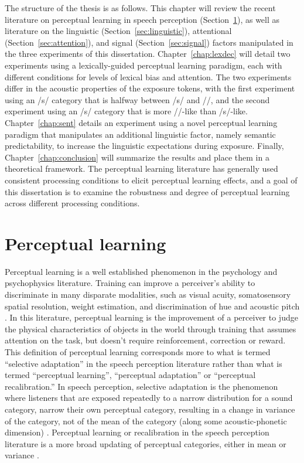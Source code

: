 The structure of the thesis is as follows.
This chapter will review the recent literature on perceptual learning in speech perception (Section~\ref{sec:perceptuallearning}), as well as literature on the linguistic (Section~\ref{sec:linguistic}), attentional (Section~\ref{sec:attention}), and signal (Section~\ref{sec:signal}) factors manipulated in the three experiments of this dissertation.
Chapter~\ref{chap:lexdec} will detail two experiments using a lexically-guided perceptual learning paradigm, each with different conditions for levels of lexical bias and attention.  
The two experiments differ in the acoustic properties of the exposure tokens, with the first experiment using an /s/ category that is halfway between /s/ and /\textesh/, and the second experiment using an /s/ category that is more /\textesh/-like than /s/-like.  
Chapter~\ref{chap:sent} details an experiment using a novel perceptual learning paradigm that manipulates an additional linguistic factor, namely semantic predictability, to increase the linguistic expectations during exposure.
Finally, Chapter~\ref{chap:conclusion} will summarize the results and place them in a theoretical framework.
The perceptual learning literature has generally used consistent processing conditions to elicit perceptual learning effects, and a goal of this dissertation is to examine the robustness and degree of perceptual learning across different processing conditions.

\section{Perceptual learning}
\label{sec:perceptuallearning}

Perceptual learning is a well established phenomenon in the psychology and psychophysics literature. 
Training can improve a perceiver's ability to discriminate in many disparate modalities, such as visual acuity, somatosensory spatial resolution, weight estimation, and discrimination of hue and acoustic pitch \citep[for review]{Gibson1953}. 
In this literature, perceptual learning is the improvement of a perceiver to judge the physical characteristics of objects in the world through training that assumes attention on the task, but doesn't require reinforcement, correction or reward.
This definition of perceptual learning corresponds more to what is termed ``selective adaptation'' in the speech perception literature rather than what is termed ``perceptual learning'', ``perceptual adaptation'' or ``perceptual recalibration.''  
In speech perception, selective adaptation is the phenomenon where listeners that are exposed repeatedly to a narrow distribution for a sound category, narrow their own perceptual category, resulting in a change in variance of the category, not of the mean of the category (along some acoustic-phonetic dimension) \citep{Eimas1973,Samuel1986,Vroomen2007}.
Perceptual learning or recalibration in the speech perception literature is a more broad updating of perceptual categories, either in mean or variance \citep{Norris2003, Vroomen2007}.

